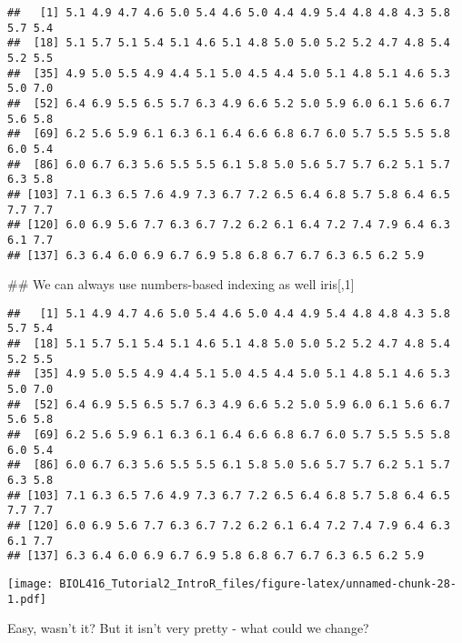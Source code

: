 \documentclass[]{article}
\newenvironment{Shaded}{\begin{snugshade}}{\end{snugshade}}
\newcommand{\KeywordTok}[1]{\textcolor[rgb]{0.13,0.29,0.53}{\textbf{#1}}}
\newcommand{\DecValTok}[1]{\textcolor[rgb]{0.00,0.00,0.81}{#1}}
\newcommand{\CommentTok}[1]{\textcolor[rgb]{0.56,0.35,0.01}{\textit{#1}}}
\newcommand{\OperatorTok}[1]{\textcolor[rgb]{0.81,0.36,0.00}{\textbf{#1}}}
\newcommand{\NormalTok}[1]{#1}
\begin{document}
\begin{verbatim}
##   [1] 5.1 4.9 4.7 4.6 5.0 5.4 4.6 5.0 4.4 4.9 5.4 4.8 4.8 4.3 5.8 5.7 5.4
##  [18] 5.1 5.7 5.1 5.4 5.1 4.6 5.1 4.8 5.0 5.0 5.2 5.2 4.7 4.8 5.4 5.2 5.5
##  [35] 4.9 5.0 5.5 4.9 4.4 5.1 5.0 4.5 4.4 5.0 5.1 4.8 5.1 4.6 5.3 5.0 7.0
##  [52] 6.4 6.9 5.5 6.5 5.7 6.3 4.9 6.6 5.2 5.0 5.9 6.0 6.1 5.6 6.7 5.6 5.8
##  [69] 6.2 5.6 5.9 6.1 6.3 6.1 6.4 6.6 6.8 6.7 6.0 5.7 5.5 5.5 5.8 6.0 5.4
##  [86] 6.0 6.7 6.3 5.6 5.5 5.5 6.1 5.8 5.0 5.6 5.7 5.7 6.2 5.1 5.7 6.3 5.8
## [103] 7.1 6.3 6.5 7.6 4.9 7.3 6.7 7.2 6.5 6.4 6.8 5.7 5.8 6.4 6.5 7.7 7.7
## [120] 6.0 6.9 5.6 7.7 6.3 6.7 7.2 6.2 6.1 6.4 7.2 7.4 7.9 6.4 6.3 6.1 7.7
## [137] 6.3 6.4 6.0 6.9 6.7 6.9 5.8 6.8 6.7 6.7 6.3 6.5 6.2 5.9
\end{verbatim}

\begin{Shaded}
\begin{Highlighting}[]
\NormalTok{## We can always use numbers-based indexing as well}
\NormalTok{iris[,}\DecValTok{1}\NormalTok{]}
\end{Highlighting}
\end{Shaded}

\begin{verbatim}
##   [1] 5.1 4.9 4.7 4.6 5.0 5.4 4.6 5.0 4.4 4.9 5.4 4.8 4.8 4.3 5.8 5.7 5.4
##  [18] 5.1 5.7 5.1 5.4 5.1 4.6 5.1 4.8 5.0 5.0 5.2 5.2 4.7 4.8 5.4 5.2 5.5
##  [35] 4.9 5.0 5.5 4.9 4.4 5.1 5.0 4.5 4.4 5.0 5.1 4.8 5.1 4.6 5.3 5.0 7.0
##  [52] 6.4 6.9 5.5 6.5 5.7 6.3 4.9 6.6 5.2 5.0 5.9 6.0 6.1 5.6 6.7 5.6 5.8
##  [69] 6.2 5.6 5.9 6.1 6.3 6.1 6.4 6.6 6.8 6.7 6.0 5.7 5.5 5.5 5.8 6.0 5.4
##  [86] 6.0 6.7 6.3 5.6 5.5 5.5 6.1 5.8 5.0 5.6 5.7 5.7 6.2 5.1 5.7 6.3 5.8
## [103] 7.1 6.3 6.5 7.6 4.9 7.3 6.7 7.2 6.5 6.4 6.8 5.7 5.8 6.4 6.5 7.7 7.7
## [120] 6.0 6.9 5.6 7.7 6.3 6.7 7.2 6.2 6.1 6.4 7.2 7.4 7.9 6.4 6.3 6.1 7.7
## [137] 6.3 6.4 6.0 6.9 6.7 6.9 5.8 6.8 6.7 6.7 6.3 6.5 6.2 5.9
\end{verbatim}

\begin{Shaded}
\end{Shaded}

\texttt{[image: BIOL416\_Tutorial2\_IntroR\_files/figure-latex/unnamed-chunk-28-1.pdf]}

Easy, wasn't it? But it isn't very pretty - what could we change?
\end{document}
